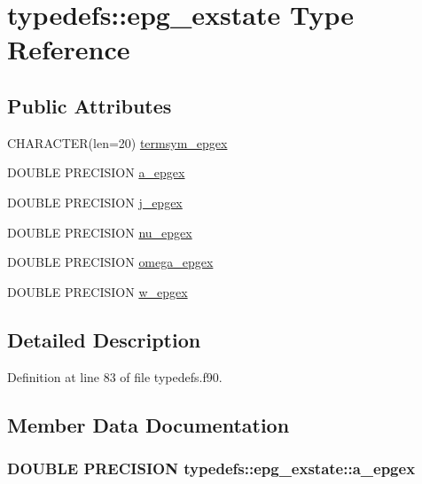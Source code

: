 \hypertarget{typetypedefs_1_1epg__exstate}{
\section{typedefs::epg\_\-exstate Type Reference}
\label{typetypedefs_1_1epg__exstate}
}
\subsection*{Public Attributes}
\begin{DoxyCompactItemize}
\item 
CHARACTER(len=20) \hyperlink{typetypedefs_1_1epg__exstate_abb12fa8ac79b7b77d90f7dd1f0519222}{termsym\_\-epgex}
\item 
DOUBLE PRECISION \hyperlink{typetypedefs_1_1epg__exstate_a80825059cab2f5a2a47f9233ee2694c3}{a\_\-epgex}
\item 
DOUBLE PRECISION \hyperlink{typetypedefs_1_1epg__exstate_ab752c0ea7171e84c8846f5b45373321c}{j\_\-epgex}
\item 
DOUBLE PRECISION \hyperlink{typetypedefs_1_1epg__exstate_a10f13ccae9fbfd2620616a1d6f7d7d46}{nu\_\-epgex}
\item 
DOUBLE PRECISION \hyperlink{typetypedefs_1_1epg__exstate_a46024cb2b6ef6bd809a2ee3d43769b60}{omega\_\-epgex}
\item 
DOUBLE PRECISION \hyperlink{typetypedefs_1_1epg__exstate_a06dc6c0176150e54c25ebc5de0f9a50c}{w\_\-epgex}
\end{DoxyCompactItemize}


\subsection{Detailed Description}


Definition at line 83 of file typedefs.f90.

\subsection{Member Data Documentation}
\hypertarget{typetypedefs_1_1epg__exstate_a80825059cab2f5a2a47f9233ee2694c3}{
\subsubsection[{a\_\-epgex}]{\setlength{\rightskip}{0pt plus 5cm}DOUBLE PRECISION {\bf typedefs::epg\_\-exstate::a\_\-epgex}}}
\label{typetypedefs_1_1epg__exstate_a80825059cab2f5a2a47f9233ee2694c3}


